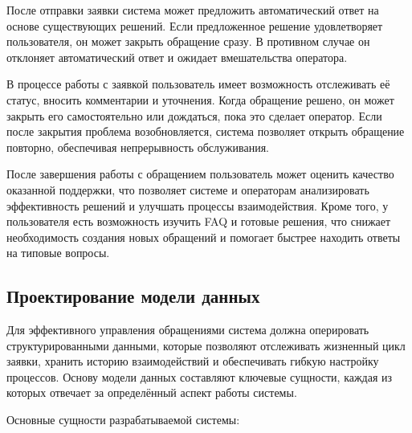 
После отправки заявки система может предложить автоматический ответ на основе существующих решений. Если предложенное решение удовлетворяет пользователя, он может закрыть обращение сразу. В противном случае он отклоняет автоматический ответ и ожидает вмешательства оператора.

В процессе работы с заявкой пользователь имеет возможность отслеживать её статус, вносить комментарии и уточнения. Когда обращение решено, он может закрыть его самостоятельно или дождаться, пока это сделает оператор. Если после закрытия проблема возобновляется, система позволяет открыть обращение повторно, обеспечивая непрерывность обслуживания.

После завершения работы с обращением пользователь может оценить качество оказанной поддержки, что позволяет системе и операторам анализировать эффективность решений и улучшать процессы взаимодействия. Кроме того, у пользователя есть возможность изучить FAQ и готовые решения, что снижает необходимость создания новых обращений и помогает быстрее находить ответы на типовые вопросы.

\subsection{Проектирование модели данных}

Для эффективного управления обращениями система должна оперировать структурированными данными, которые позволяют отслеживать жизненный цикл заявки, хранить историю взаимодействий и обеспечивать гибкую настройку процессов. Основу модели данных составляют ключевые сущности, каждая из которых отвечает за определённый аспект работы системы.

Основные сущности разрабатываемой системы:

